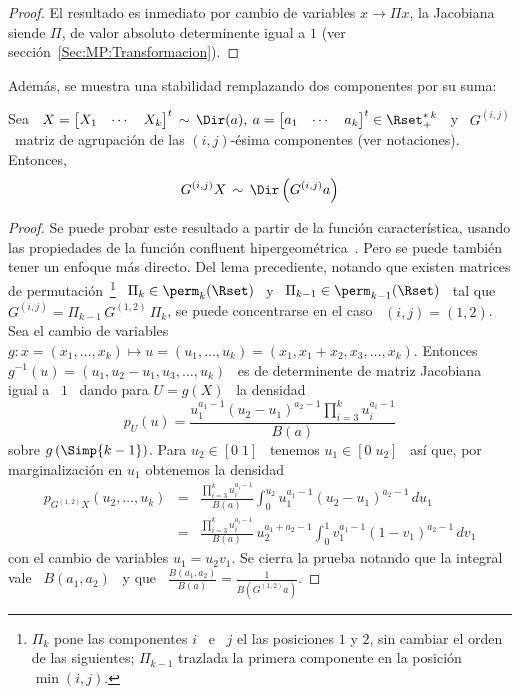 %
\begin{proof}
  El resultado es inmediato por cambio  de variables $x \to \Pi x$, la Jacobiana
  siende   $\Pi$,   de   valor   absoluto   determinente  igual   a   $1$   (ver
  secci\'on~\ref{Sec:MP:Transformacion}).
\end{proof}
%
Adem\'as, se muestra una stabilidad remplazando dos componentes por su suma:
%
\begin{lema}\label{Lem:MP:StabSumaDir}
%
  Sea  \ $X =  \begin{bmatrix} X_1  & \cdots  & X_k  \end{bmatrix}^t \,  \sim \,
  \Dir(a),  \:  a =  \begin{bmatrix}  a_1 &  \cdots  &  a_k \end{bmatrix}^t  \in
  \Rset_+^{*  \,  k}$  \  y  \  $G^{(i,j)}$ \  matriz  de  agrupaci\'on  de  las
  $(i,j)$-\'esima componentes (ver notaciones). Entonces,
  \[
  G^{(i,j)} X \, \sim \, \Dir\left( G^{(i,j)} a \right)  
  \]
\end{lema}
%
\begin{proof}
  Se  puede probar  este resultado  a partir  de la  funci\'on caracter\'istica,
  usando      las      propiedades      de      la      funci\'on      confluent
  hipergeom\'etrica~\cite{SriKar85, Hum22, App25,  AppKam26, Erd37, Erd40}. Pero
  se  puede tambi\'en  tener un  enfoque m\'as  directo.  Del  lema precediente,
  notando  que  existen  matrices  de permutaci\'on~\footnote{$\Pi_k$  pone  las
    componentes $i$ \ e \ $j$ el  las posiciones $1$ y $2$, sin cambiar el orden
    de  las  siguientes;  $\Pi_{k-1}$  trazlada  la  primera  componente  en  la
    posici\'on $\min(i,j)$.}  \ $\Pi_k \in  \perm_k(\Rset)$ \ y \ $\Pi_{k-1} \in
  \perm_{k-1}(\Rset)$ \ tal que \ $G^{(i,j)} = \Pi_{k-1} \, G^{(1,2)} \, \Pi_k$,
  se puede concentrarse en el caso \ $(i,j) = (1,2)$. Sea el cambio de variables
  $g:    x    =    (x_1,\ldots,x_k)    \mapsto   u    =    (u_1,\ldots,u_k)    =
  (x_1,x_1+x_2,x_3,\ldots,x_k)$.        Entonces       \      $g^{-1}(u)       =
  (u_1,u_2-u_1,u_3,\ldots,u_k)$ \ es de determinente de matriz Jacobiana igual a
  \ $1$ \ dando para $U = g(X)$ \ la densidad
  \[
  p_U(u)  = \frac{u_1^{a_1-1}  \left(  u_2 -  u_1 \right)^{a_2-1}  \prod_{i=3}^k
    u_i^{a_i-1}}{B(a)}
  \]
  sobre $g\left(  \Simp{k-1} \right)$. Para $u_2  \in [0 \; 1]$  \ tenemos $u_1
  \in [  0 \;  u_2]$ \ as\'i  que, por  marginalizaci\'on en $u_1$  obtenemos la
  densidad
  \begin{eqnarray*}
  p_{G^{(1,2)} X}(u_2,\ldots,u_k) & = & \frac{\prod_{i=3}^k u_i^{a_i-1}}{B(a)}
  \int_0^{u_2} u_1^{a_1-1} \left( u_2 - u_1 \right)^{a_2-1} \, du_1\\[2mm]
  & = & \frac{\prod_{i=3}^k u_i^{a_i-1}}{B(a)} \, u_2^{a_1+a_2-1} \int_0^1
  v_1^{a_1-1} \left( 1 - v_1 \right)^{a_2-1} \, dv_1
  \end{eqnarray*}
  con el cambio de variables $u_1 = u_2 v_1$. Se cierra la prueba notando que la
  integral   vale  \  $B(a_1,a_2)$   \  y   que  \   $\frac{B(a_1,a_2)}{B(a)}  =
  \frac{1}{B\left( G^{(1,2)} a \right)}$.
\end{proof}

